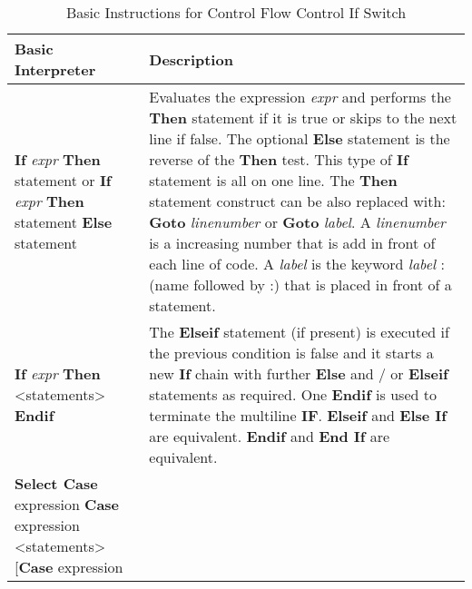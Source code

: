 \begin{table}[]
\centering
\caption{Basic Instructions for Control Flow Control If Switch}
\label{Basic_Instructions_for_Control_Flow_Control_If_Switch}
\begin{tabular}{|p{4cm}|p{10cm}|}
\hline
\textbf{Basic Interpreter} & \textbf{Description}                                                       \\ \hline
\textbf{If} \textit{expr} \textbf{Then} statement\newline
or\newline
\textbf{If} \textit{expr} \textbf{Then} statement\newline
\textbf{Else} statement
 & Evaluates the expression \textit{expr} and performs the \textbf{Then} statement if it is
true or skips to the next line if false. The optional \textbf{Else} statement is the
reverse of the \textbf{Then} test. This type of \textbf{If} statement is all on one line.
The \textbf{Then} statement construct can be also replaced with:
\textbf{Goto} \textit{linenumber} or \textbf{Goto} \textit{label}. A \textit{linenumber} is a increasing number that is add in front of each line of code. A \textit{label} is the keyword \textit{label} : (name followed by :) that is placed in front of a statement.
\\ \hline
\textbf{If} \textit{expr} \textbf{Then}\newline
<statements>\newline
\textbf{Endif}
& The \textbf{Elseif} statement (if present) is executed if the previous condition
is false and it starts a new \textbf{If} chain with further \textbf{Else} and / or \textbf{Elseif} 
statements as required.\newline
One \textbf{Endif} is used to terminate the multiline \textbf{IF}. \newline
\textbf{Elseif} and \textbf{Else If} are equivalent.\newline
\textbf{Endif} and \textbf{End If} are equivalent.
\\ \hline
\textbf{Select Case} expression\newline
\textbf{Case} expression\newline
<statements>\newline
[\textbf{Case} expression\newline

\end{tabular}
\end{table}
